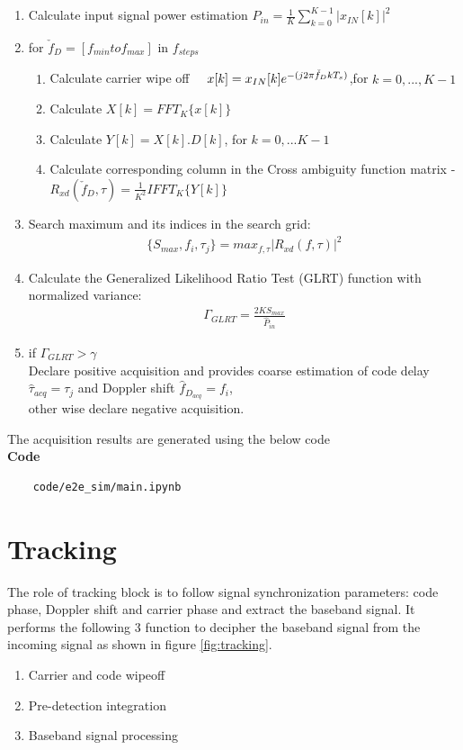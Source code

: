 \begin{enumerate}
	\item Calculate input signal power estimation  $\hat P_{in} = \frac{1}{K}\sum_{k=0}^{K-1} \big| x_{IN}[k]\big| ^2$
	\item for $\check f_D=[ f_{min} to f_{max}]\text{ in }f_{steps}$ 
	\begin{enumerate}
		\item Calculate carrier wipe off$\hspace{0.5cm}x[k]=x_{IN}[k]e^{-(j2 \pi \check f_D k T_s)}$,for $k=0,...,K-1$
		\item Calculate $X[k]=FFT_K\{x[k]\}$
		\item Calculate $Y[k]=X[k].D[k]$, for $k=0,...K-1$ 
        	\item Calculate corresponding column in the Cross ambiguity function matrix - $R_{xd}(\check f_D,\tau) = \frac{1}{K^2}IFFT_K\{Y[k]\}$
        \end{enumerate}

        \item Search maximum and its indices in the search grid:
	\begin{align}
		\{S_{max},f_i,\tau_j\} = max_{f,\tau} \big |R_{xd}(f,\tau)\big | ^2
	\end{align}
        \item	Calculate the Generalized Likelihood Ratio Test (GLRT) function with normalized variance:
	\begin{align}
		\Gamma_{GLRT} = \frac{2KS_{max}}{\hat P_{in}}
	\end{align}
	\item if $\Gamma_{GLRT} > \gamma$\\
	Declare positive acquisition and provides coarse estimation of code delay $\hat \tau_{acq} = \tau_j $ and Doppler shift $\hat f_{D_{acq}}=f_i$,\\
	other wise declare negative acquisition.\\
\end{enumerate}
The acquisition results are generated using the below code\\
\textbf{Code}
\begin{lstlisting}
	code/e2e_sim/main.ipynb
\end{lstlisting}

\section{Tracking}
The role of tracking block is to follow signal synchronization parameters: code phase, Doppler shift and carrier phase and extract the baseband signal. It performs the following 3 function to decipher the baseband signal from the incoming signal as shown in figure \ref{fig:tracking}. 
\begin{enumerate}
	\item Carrier and code wipeoff 
	\item Pre-detection integration
	\item Baseband signal processing
\end{enumerate}

